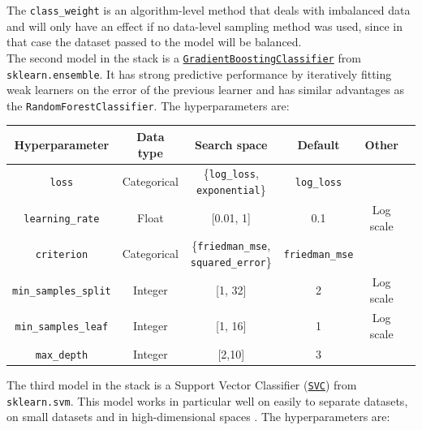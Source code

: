 \documentclass[11pt]{article}
\begin{document}
The \texttt{class\_weight} is an algorithm-level method that deals with imbalanced data and will only have an effect if no data-level sampling method was used, since in that case the dataset passed to the model will be balanced. \\

The second model in the stack is a \href{https://scikit-learn.org/stable/modules/generated/sklearn.ensemble.GradientBoostingClassifier.html}{\texttt{GradientBoostingClassifier}} from \texttt{sklearn.ensemble}. It has strong predictive performance by iteratively fitting weak learners on the error of the previous learner and has similar advantages as the \texttt{RandomForestClassifier}. The hyperparameters are:

\vspace{-0.3cm}
\begin{table}[H]
\centering
\begin{tabular}{ | c | c | c | c | c | c | }
 \hline
  Hyperparameter & Data type & Search space & Default & Other \\
 \hline
 \texttt{loss} & Categorical & \{\texttt{log\_loss}, \texttt{exponential}\} & \texttt{log\_loss} &  \\ 
 \texttt{learning\_rate} & Float & [0.01, 1] & 0.1 & Log scale  \\ 
 \texttt{criterion} & Categorical & \{\texttt{friedman\_mse}, \texttt{squared\_error}\} & \texttt{friedman\_mse} &   \\ 
 \texttt{min\_samples\_split} & Integer & [1, 32] & 2 & Log scale \\ 
 \texttt{min\_samples\_leaf} & Integer & [1, 16] & 1 & Log scale  \\
 \texttt{max\_depth}  & Integer & [2,10] & 3 &  \\ 
 \hline
\end{tabular}
\end{table}
\vspace{-0.3cm}

The third model in the stack is a Support Vector Classifier (\href{https://scikit-learn.org/stable/modules/generated/sklearn.svm.SVC.html#sklearn.svm.SVC}{\texttt{SVC}}) from \texttt{sklearn.svm}. This model works in particular well on easily to separate datasets, on small datasets and in high-dimensional spaces \citep{GfG}. The hyperparameters are:
\end{document}
